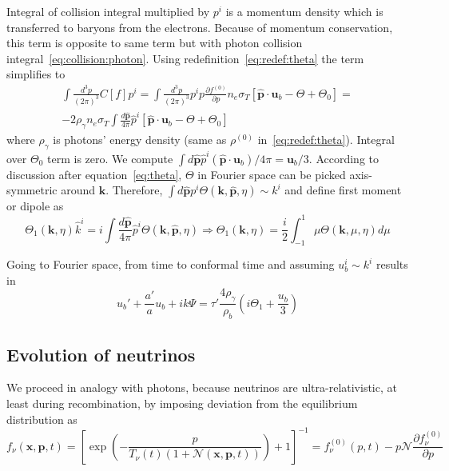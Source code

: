 \documentclass[12pt]{extarticle}
\numberwithin{problem}{section}
\numberwithin{theorem}{section}
\begin{document}
	Integral of collision integral multiplied by $p^i$ is a momentum density which is transferred to baryons from the electrons. Because of momentum conservation, this term is opposite to same term but with photon collision integral~\ref{eq:collision:photon}. Using redefinition~\ref{eq:redef:theta} the term simplifies to
	\begin{multline}
		\int \frac{d^3p}{(2\pi)^3} C[f]p^i = \int\frac{d^3p}{(2\pi)^3} p^ip\frac{\partial f^{(0)}}{\partial p}n_e\sigma_T\left[\mathbf{\hat{p}}\cdot\mathbf{u}_b - \Theta + \Theta_0\right] =\\
		-2\rho_\gamma n_e\sigma_T\int\frac{d\mathbf{\hat{p}}}{4\pi}\hat{p}^i[\mathbf{\hat{p}}\cdot\mathbf{u}_b - \Theta + \Theta_0]
	\end{multline}
	where $\rho_\gamma$ is photons' energy density (same as $\rho^{(0)}$ in~\ref{eq:redef:theta}). Integral over $\Theta_0$ term is zero. We compute $\int d\mathbf{\hat{p}} \hat{p}^i(\mathbf{\hat{p}}\cdot\mathbf{u}_b)/4\pi = \mathbf{u}_b / 3$. According to discussion after equation~\ref{eq:theta}, $\Theta$ in Fourier space can be picked axis-symmetric around $\mathbf{k}$. Therefore, $\int d\mathbf{\hat{p}} p^i \Theta(\mathbf{k}, \mathbf{\hat{p}}, \eta)\sim k^i$ and define first moment or dipole as
	\begin{equation}
		\Theta_1(\mathbf{k}, \eta)\hat{k}^i = i\int \frac{d\mathbf{\hat{p}}}{4\pi} \hat{p}^i\Theta(\mathbf{k}, \mathbf{\hat{p}}, \eta)\Rightarrow\Theta_1(\mathbf{k}, \eta) = \frac{i}{2}\int^{1}_{-1}\mu\Theta(\mathbf{k},\mu,\eta) d\mu
	\end{equation}
	
	Going to Fourier space, from time to conformal time and assuming $u^i_b\sim k^i$ results in 
	\begin{equation}
		\label{eq:baryons}
		u_b' + \frac{a'}{a}u_b + ik\Psi = \tau'\frac{4\rho_\gamma}{\rho_b}\left(i\Theta_1 + \frac{u_b}{3}\right)		
	\end{equation}

	\subsection{Evolution of neutrinos}
	We proceed in analogy with photons, because neutrinos are ultra-relativistic, at least during recombination, by imposing deviation from the equilibrium distribution as
	\begin{equation}
		f_\nu(\mathbf{x}, \mathbf{p}, t) = \left[\exp\left(-\frac{p}{T_\nu(t)(1 + \mathcal{N}(\mathbf{x}, \mathbf{p}, t))}\right) + 1\right]^{-1} = f_\nu^{(0)}(p, t) - p\mathcal{N}\frac{\partial f_\nu^{(0)}}{\partial p}
	\end{equation}
\end{document}
